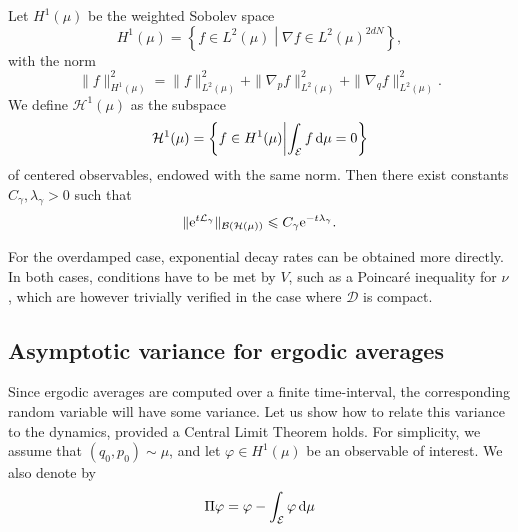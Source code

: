         \begin{prop}
            Let $H^1(\mu)$ be the weighted Sobolev space 
            \begin{equation}
                \label{eq:weighted_sobolev_space}
                H^1(\mu)=\left\{f\in L^2(\mu) \middle| \nabla f \in L^2(\mu)^{2dN}\right\},
            \end{equation}
            with the norm 
            \[\|f\|^2_{H^1(\mu)}=\|f\|^2_{L^2(\mu)}+\|\nabla_p f\|^2_{L^2(\mu)}+\|\nabla_q f\|^2_{L^2(\mu)}.\]
            We define $\mathcal H^1(\mu)$ as the subspace
            \[\mathcal H^1(\mu)=\left\{f\in H^1(\mu) \middle| \int_{\mathcal E}f\,\mathrm{d} \mu=0\right\}\]
            of centered observables, endowed with the same norm. Then there exist constants $C_\gamma,\lambda_\gamma >0$ such that 
            \begin{equation}
                \label{eq:semigroup_exp_decay}
                \|\mathrm{e}^{t\mathcal{L}_\gamma}\|_{\mathcal{B}(\mathcal{H}(\mu))}\leqslant C_\gamma \mathrm{e}^{-t\lambda_\gamma}.
            \end{equation}
        \end{prop}
        For the overdamped case, exponential decay rates can be obtained more directly. 
        In both cases, conditions have to be met by $V$, such as a Poincaré inequality for $\nu$, which are however trivially verified in the case where $\mathcal D$ is compact.
        
        \subsection{Asymptotic variance for ergodic averages}\label{subsec:asymptotic_variance_cont}
        Since ergodic averages are computed over a finite time-interval, the corresponding random variable will have some variance. 
        Let us show how to relate this variance to the dynamics, provided a Central Limit Theorem holds.
        For simplicity, we assume that $(q_0,p_0)\sim \mu$, and let $\varphi \in H^1(\mu)$ be an observable of interest. We also denote by
        \begin{equation}
            \label{eq:equilibrium_projector}
            \Pi \varphi = \varphi -\int_\mathcal{E}\varphi\,\mathrm{d} \mu
        \end{equation}
        
